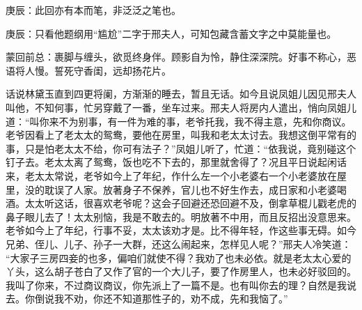 \begin{parag}
    \begin{note}庚辰：此回亦有本而笔，非泛泛之笔也。\end{note}
\end{parag}


\begin{parag}
    \begin{note}庚辰：只看他题纲用“尴尬”二字于邢夫人，可知包藏含蓄文字之中莫能量也。\end{note}
\end{parag}


\begin{parag}
    \begin{note}蒙回前总：裹脚与缠头，欲觅终身伴。顾影自为怜，静住深深院。好事不称心，恶语将人慢。誓死守香闺，远却扬花片。\end{note}
\end{parag}


\begin{parag}
    话说林黛玉直到四更将阑，方渐渐的睡去，暂且无话。如今且说凤姐儿因见邢夫人叫他，不知何事，忙另穿戴了一番，坐车过来。邢夫人将房内人遣出，悄向凤姐儿道：“叫你来不为别事，有一件为难的事，老爷托我，我不得主意，先和你商议。老爷因看上了老太太的鸳鸯，要他在房里，叫我和老太太讨去。我想这倒平常有的事，只是怕老太太不给，你可有法子？”凤姐儿听了，忙道：“依我说，竟别碰这个钉子去。老太太离了鸳鸯，饭也吃不下去的，那里就舍得了？况且平日说起闲话来，老太太常说，老爷如今上了年纪，作什么左一个小老婆右一个小老婆放在屋里，没的耽误了人家。放著身子不保养，官儿也不好生作去，成日家和小老婆喝酒。太太听这话，很喜欢老爷呢？这会子回避还恐回避不及，倒拿草棍儿戳老虎的鼻子眼儿去了！太太别恼，我是不敢去的。明放著不中用，而且反招出没意思来。老爷如今上了年纪，行事不妥，太太该劝才是。比不得年轻，作这些事无碍。如今兄弟、侄儿、儿子、孙子一大群，还这么闹起来，怎样见人呢？”邢夫人冷笑道： “大家子三房四妾的也多，偏咱们就使不得？我劝了也未必依。就是老太太心爱的丫头，这么胡子苍白了又作了官的一个大儿子，要了作房里人，也未必好驳回的。我叫了你来，不过商议商议，你先派上了一篇不是。也有叫你去的理？自然是我说去。你倒说我不劝，你还不知道那性子的，劝不成，先和我恼了。”
\end{parag}


